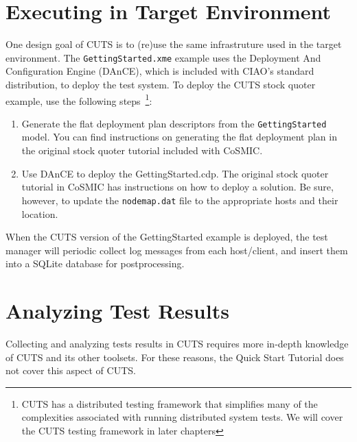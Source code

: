 \section{Executing in Target Environment}
\label{sec:quickstart-execution}

One design goal of CUTS is to (re)use the same infrastruture used in the 
target environment. The \texttt{GettingStarted.xme} example uses the Deployment 
And Configuration Engine (DAnCE), which is included with CIAO's standard 
distribution, to deploy the test system. To deploy the CUTS stock quoter 
example, use the following steps~\footnote{CUTS has a distributed testing
framework that simplifies many of the complexities associated with running
distributed system tests. We will cover the CUTS testing framework in later
chapters}:
\begin{enumerate}
  \item Generate the flat deployment plan descriptors from the 
  \texttt{GettingStarted}  model. You can find instructions on generating 
  the flat deployment plan in the original stock quoter tutorial included 
  with CoSMIC.
  
  \item Use DAnCE to deploy the GettingStarted.cdp. The original stock 
  quoter tutorial in CoSMIC has instructions on how to deploy a solution. 
  Be sure, however, to update the \texttt{nodemap.dat} file to the appropriate
  hosts and their location.
\end{enumerate}
When the CUTS version of the GettingStarted example is deployed, the test
manager will periodic collect log messages from each host/\-client, and 
insert them into a SQLite database for postprocessing.

\section{Analyzing Test Results}
\label{sec:quickstart-analysis}

Collecting and analyzing tests results in CUTS requires more in-depth
knowledge of CUTS and its other toolsets. For these reasons, the Quick
Start Tutorial does not cover this aspect of CUTS.


